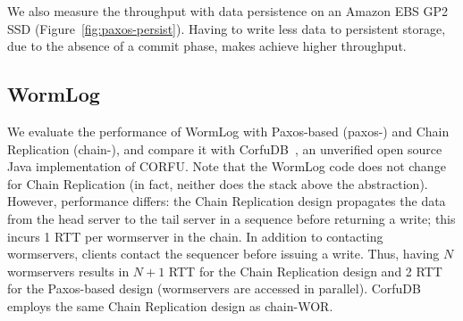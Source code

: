 We also measure the throughput with data persistence on an Amazon EBS GP2 SSD (Figure~\ref{fig:paxos-persist}). Having to write less data to persistent storage, due to the absence of a commit phase, makes \wormpaxos{} achieve higher throughput. 



\subsection{WormLog}

We evaluate the performance of WormLog with Paxos-based \WORs{} (paxos-\WOR{}) and Chain Replication \WORs{} (chain-\WOR{}), and compare it with CorfuDB~\cite{corfudb}, an unverified open source Java implementation of CORFU. Note that the WormLog code does not change for Chain Replication \WORs{} (in fact, neither does the \sysname{} stack above the \WOR{} abstraction). However, performance differs: the Chain Replication design propagates the data from the head server to the tail server in a sequence before returning a write; this incurs 1 RTT per wormserver in the chain. In addition to contacting wormservers, clients contact the sequencer before issuing a write. Thus, having $N$ wormservers results in $N+1$ RTT for the Chain Replication design and 2 RTT for the Paxos-based design (wormservers are accessed in parallel). CorfuDB employs the same Chain Replication design as chain-WOR{}.

